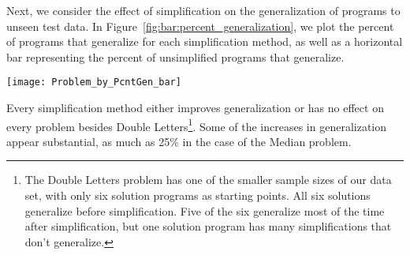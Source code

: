 
Next, we consider the effect of simplification on the generalization of programs to unseen test data. In Figure~\ref{fig:bar:percent_generalization}, we plot the percent of programs that generalize for each simplification method, as well as a horizontal bar representing the percent of unsimplified programs that generalize.

\begin{figure*}[t] %
\centering
\texttt{[image: Problem\_by\_PcntGen\_bar]} %
\caption{For each problem, we plot the percent of simplified programs that generalize to unseen data, as well as the percent of unchanged programs that generalize as black horizontal bars.
 \hl{Question: In this figure, how much of the time are the simplified programs significantly better at generalization than the unsimplified programs? How would we measure this? Do we need to?}}
\label{fig:bar:percent_generalization}
\end{figure*}

Every simplification method either improves generalization or has no effect on every problem besides Double Letters\footnote{The Double Letters problem has one of the smaller sample sizes of our data set, with only six solution programs as starting points. All six solutions generalize before simplification. Five of the six generalize most of the time after simplification, but one solution program has many simplifications that don't generalize.}. Some of the increases in generalization appear substantial, as much as 25\% in the case of the Median problem.

